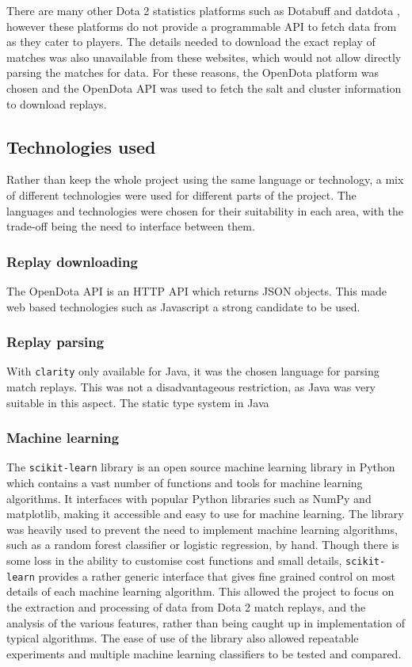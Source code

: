 \documentclass[Report.tex]{subfiles}
\begin{document}
There are many other Dota 2 statistics platforms such as Dotabuff \cite{dotabuff} and datdota \cite{datdota}, however these platforms do not provide a programmable API to fetch data from as they cater to players. The details needed to download the exact replay of matches was also unavailable from these websites, which would not allow directly parsing the matches for data. For these reasons, the OpenDota platform was chosen and the OpenDota API was used to fetch the salt and cluster information to download replays. 


\subsection{Technologies used}
Rather than keep the whole project using the same language or technology, a mix of different technologies were used for different parts of the project. The languages and technologies were chosen for their suitability in each area, with the trade-off being the need to interface between them. 
\subsubsection{Replay downloading}
The OpenDota API is an HTTP API which returns JSON objects. This made web based technologies such as Javascript a strong candidate to be used. 

\subsubsection{Replay parsing}
With \texttt{clarity} only available for Java, it was the chosen language for parsing match replays. This was not a disadvantageous restriction, as Java was very suitable in this aspect. The static type system in Java 



\subsubsection{Machine learning}
The \texttt{scikit-learn} library \cite{sklearn} is an open source machine learning library in Python which contains a vast number of functions and tools for machine learning algorithms. It interfaces with popular Python libraries such as NumPy and matplotlib, making it accessible and easy to use for machine learning. The library was heavily used to prevent the need to implement machine learning algorithms, such as a random forest classifier or logistic regression, by hand. Though there is some loss in the ability to customise cost functions and small details, \texttt{scikit-learn} provides a rather generic interface that gives fine grained control on most details of each machine learning algorithm. This allowed the project to focus on the extraction and processing of data from Dota 2 match replays, and the analysis of the various features, rather than being caught up in implementation of typical algorithms. The ease of use of the library also allowed repeatable experiments and multiple machine learning classifiers to be tested and compared.
\end{document}
